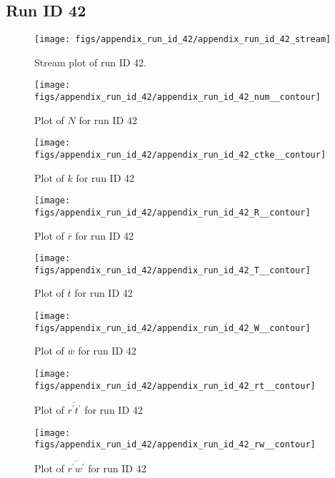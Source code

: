 \subsection{Run ID 42}
\begin{figure}[H]
\centering
\texttt{[image: figs/appendix\_run\_id\_42/appendix\_run\_id\_42\_stream]}
\caption{Stream plot of run ID 42.}
\label{fig:appendix_run_id_42_stream}
\end{figure}


\begin{figure}[H]
\centering
\texttt{[image: figs/appendix\_run\_id\_42/appendix\_run\_id\_42\_num\_\_contour]}
\caption{Plot of $N$ for run ID 42}
\label{fig:appendix_run_id_42_num__contour}
\end{figure}


\begin{figure}[H]
\centering
\texttt{[image: figs/appendix\_run\_id\_42/appendix\_run\_id\_42\_ctke\_\_contour]}
\caption{Plot of $k$ for run ID 42}
\label{fig:appendix_run_id_42_ctke__contour}
\end{figure}


\begin{figure}[H]
\centering
\texttt{[image: figs/appendix\_run\_id\_42/appendix\_run\_id\_42\_R\_\_contour]}
\caption{Plot of $\overline{r}$ for run ID 42}
\label{fig:appendix_run_id_42_R__contour}
\end{figure}


\begin{figure}[H]
\centering
\texttt{[image: figs/appendix\_run\_id\_42/appendix\_run\_id\_42\_T\_\_contour]}
\caption{Plot of $\overline{t}$ for run ID 42}
\label{fig:appendix_run_id_42_T__contour}
\end{figure}


\begin{figure}[H]
\centering
\texttt{[image: figs/appendix\_run\_id\_42/appendix\_run\_id\_42\_W\_\_contour]}
\caption{Plot of $\overline{w}$ for run ID 42}
\label{fig:appendix_run_id_42_W__contour}
\end{figure}


\begin{figure}[H]
\centering
\texttt{[image: figs/appendix\_run\_id\_42/appendix\_run\_id\_42\_rt\_\_contour]}
\caption{Plot of $\overline{r^\prime t^\prime}$ for run ID 42}
\label{fig:appendix_run_id_42_rt__contour}
\end{figure}


\begin{figure}[H]
\centering
\texttt{[image: figs/appendix\_run\_id\_42/appendix\_run\_id\_42\_rw\_\_contour]}
\caption{Plot of $\overline{r^\prime w^\prime}$ for run ID 42}
\label{fig:appendix_run_id_42_rw__contour}
\end{figure}


